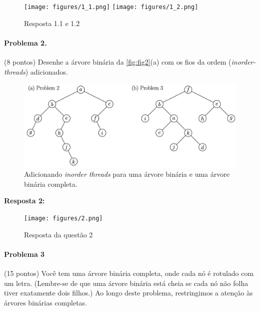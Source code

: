 \documentclass{article}
\begin{document}
\begin{figure}[!h]
  \centering
    \texttt{[image: figures/1\_1.png]}
    \texttt{[image: figures/1\_2.png]}
    \caption{Resposta 1.1 e 1.2}
  \label{fig:resp1_1}
\end{figure}


\paragraph{Problema 2.} (8 pontos) Desenhe a árvore binária da \autoref{fig:fig2}(a) com os fios da ordem (\emph{inorder-threads}) adicionados.

\begin{figure}[!h]
  \centering
    \includegraphics[width=.6\textwidth]{figures/fig2.png}
    \caption{Adicionando \textit{inorder threads} para uma árvore binária e uma árvore binária completa.}
  \label{fig:fig2}
\end{figure}



\textbf{Resposta 2:}

\begin{figure}[!h]
  \centering
    \texttt{[image: figures/2.png]}
    \caption{Resposta da questão 2}
  \label{fig:resp1_1}
\end{figure}
 
\paragraph{Problema 3} (15 pontos) Você tem uma árvore binária completa, onde cada nó é rotulado com um letra. (Lembre-se de que uma árvore binária está cheia se cada nó não folha tiver exatamente dois filhos.) Ao longo deste problema, restringimos a atenção às árvores binárias completas.
\end{document}
